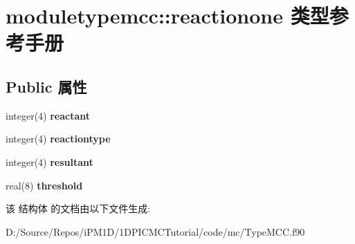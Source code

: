\hypertarget{structmoduletypemcc_1_1reactionone}{}\section{moduletypemcc\+::reactionone 类型参考手册}
\label{structmoduletypemcc_1_1reactionone}
\subsection*{Public 属性}
\begin{DoxyCompactItemize}
\item 
\mbox{\label{structmoduletypemcc_1_1reactionone_a87c478131016166ec88e4cd4bd2b1bdc}} 
integer(4) {\bfseries reactant}
\item 
\mbox{\label{structmoduletypemcc_1_1reactionone_ac75b4d3d5f78d512e125fc2f3a02ddaf}} 
integer(4) {\bfseries reactiontype}
\item 
\mbox{\label{structmoduletypemcc_1_1reactionone_a52e62039b851b4f3b8aec36122978899}} 
integer(4) {\bfseries resultant}
\item 
\mbox{\label{structmoduletypemcc_1_1reactionone_afe9aa600d88575b19ca60a1aebf5c11f}} 
real(8) {\bfseries threshold}
\end{DoxyCompactItemize}


该 结构体 的文档由以下文件生成\+:\begin{DoxyCompactItemize}
\item 
D\+:/\+Source/\+Repos/i\+P\+M1\+D/1\+D\+P\+I\+C\+M\+C\+Tutorial/code/mc/Type\+M\+C\+C.\+f90\end{DoxyCompactItemize}
